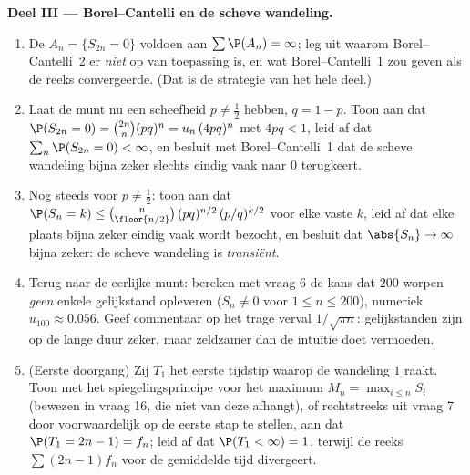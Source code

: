 \begin{problem}
\medskip
\noindent\textbf{Deel III --- Borel--Cantelli en de scheve
wandeling.}
\begin{enumerate}[resume]
  \item De  $A_n = \{S_{2n} = 0\}$ voldoen aan
        $\sum\P(A_n) = \infty$; leg uit waarom Borel--Cantelli~2
        er \emph{niet} op van toepassing is, en wat
        Borel--Cantelli~1 zou geven als de reeks convergeerde.
        (Dat is de strategie van het hele deel.)
  \item Laat de munt nu een scheefheid $p \neq \frac12$ hebben, $q
        = 1 - p$. Toon aan dat $\P(S_{2n} = 0) = \binom{2n}n(pq)^n
        = u_n\,(4pq)^n$ met $4pq < 1$, leid af dat
        $\sum_n\P(S_{2n} = 0) < \infty$, en besluit met
        Borel--Cantelli~1 dat de scheve wandeling bijna zeker
        slechts eindig vaak naar $0$ terugkeert.
  \item Nog steeds voor $p \neq \frac12$: toon aan dat $\P(S_n = k)
        \leq \binom{n}{\floor{n/2}}\,(pq)^{n/2}\,(p/q)^{k/2}$ voor
        elke vaste $k$, leid af dat elke plaats bijna zeker eindig
        vaak wordt bezocht, en besluit dat $\abs{S_n} \to \infty$
        bijna zeker: de scheve wandeling is \emph{transiënt}.
  \item Terug naar de eerlijke munt: bereken met vraag 6 de kans
        dat $200$ worpen \emph{geen} enkele gelijkstand opleveren
        ($S_n \neq 0$ voor $1 \leq n \leq 200$), numeriek
        $u_{100} \approx 0.056$. Geef commentaar op het trage
        verval $1/\sqrt{\pi n}$: gelijkstanden zijn op de lange
        duur zeker, maar zeldzamer dan de intuïtie doet vermoeden.
  \item (Eerste doorgang) Zij $T_1$ het eerste tijdstip waarop de
        wandeling $1$ raakt. Toon met het spiegelingsprincipe voor
        het maximum $M_n = \max_{i\leq n}S_i$ (bewezen in vraag 16,
        die niet van deze afhangt), of rechtstreeks uit vraag 7
        door voorwaardelijk op de eerste stap te stellen, aan dat
        $\P(T_1 = 2n - 1) = f_n$; leid af dat $\P(T_1 < \infty) =
        1$, terwijl de reeks $\sum(2n-1)f_n$ voor de gemiddelde
        tijd divergeert.
\end{enumerate}


\end{problem}
